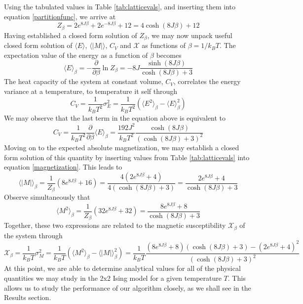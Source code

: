 Using the tabulated values in Table \ref{tab:latticevals}, and inserting them into equation \eqref{partitionfunc}, we arrive at
\begin{equation}
    Z_\beta = 2e^{8J\beta} + 2e^{-8J\beta} + 12 = 4\cosh(8J\beta) + 12
\end{equation}
Having established a closed form solution of $Z_\beta$, we may now unpack useful closed form solution of $\langle E \rangle$, $\langle |M| \rangle$, $C_V$ and $\mathcal{X}$ as functions of $\beta = 1/k_BT$. The expectation value of the energy as a function of $\beta$ becomes
\begin{equation}
    \langle E \rangle_\beta = -\frac{\partial}{\partial \beta}\ln Z_\beta = -8J\frac{\sinh(8J\beta)}{\cosh(8J\beta) + 3}
    \label{Energyclosedform}
\end{equation}
The heat capacity of the system at constant volume, $C_V$, correlates the energy variance at a temperature, to temperature it self through 
\[
C_V = \frac{1}{k_B T^2}\sigma^2_E = \frac{1}{k_B T^2}\left(\langle E^2 \rangle_\beta - \langle E \rangle^2_\beta\right)
\]
We may observe that the last term in the equation above is equivalent to
\begin{equation}
    C_V = \frac{1}{k_B T^2}\frac{\partial}{\partial \beta}\langle E \rangle _ \beta = \frac{192J^2}{k_B T^2}\frac{\cosh(8J\beta)}{\left(\cosh(8J\beta) + 3\right)^2}
    \label{heatcap}
\end{equation}
Moving on to the expected absolute magnetization, we may establish a closed form solution of this quantity by inserting values from Table \ref{tab:latticevals} into equation \eqref{magnetization}. This leads to
\begin{equation}
    \langle |M| \rangle_\beta = \frac{1}{Z_\beta}\left(8e^{8J\beta} + 16\right) = \frac{4\left(2e^{8J\beta} + 4\right)}{4\left(\cosh(8J\beta) + 3\right)} = \frac{2e^{8J\beta} + 4}{\cosh(8J\beta) + 3}
    \label{mabs}
\end{equation}
Observe simultaneously that 
\[
\langle M^2 \rangle_\beta = \frac{1}{Z_\beta}\left(32e^{8J\beta} + 32\right) = \frac{8e^{8J\beta} + 8}{\cosh(8J\beta) + 3}
\]
Together, these two expressions are related to the magnetic susceptibility $\mathcal{X}_\beta$ of the system through
\begin{equation}
    \mathcal{X}_\beta = \frac{1}{k_B T}\sigma^2_M = \frac{1}{k_B T}\left(\langle M^2 \rangle_\beta - \langle |M| \rangle^2_\beta \right) = \frac{1}{k_B T} \frac{\left(8e^{8J\beta}+8\right)\left(\cosh(8J\beta) + 3\right) - \left(2e^{8J\beta} + 4\right)^2}{\left(\cosh(8J\beta) + 3\right)^2}
    \label{suscept}
\end{equation}
At this point, we are able to determine analytical values for all of the physical quantities we may study in the 2x2 Ising model for a given temperature $T$. This allows us to study the performance of our algorithm closely, as we shall see in the Results section. 

